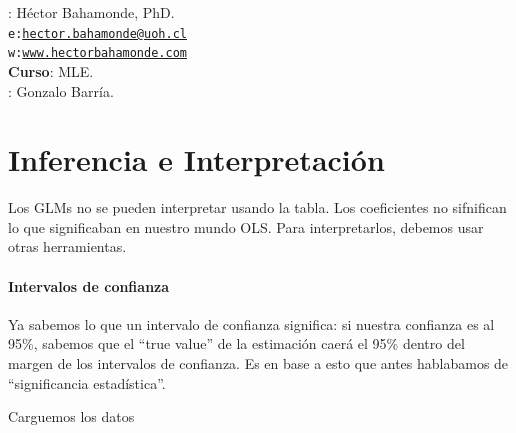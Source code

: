 \documentclass[onesided]{article}\usepackage[]{graphicx}\usepackage[]{color}
\begin{document}











\hspace{-5mm}{\bf Profesor}: H\'ector Bahamonde, PhD.\\
\texttt{e:}\href{mailto:hector.bahamonde@uoh.cl}{\texttt{hector.bahamonde@uoh.cl}}\\
\texttt{w:}\href{http://www.hectorbahamonde.com}{\texttt{www.hectorbahamonde.com}}\\
{\bf Curso}: MLE.\\
\hspace{-5mm}{\bf TA}: Gonzalo Barr\'ia.

\section{Inferencia e Interpretaci\'on}

Los GLMs no se pueden interpretar usando la tabla. Los coeficientes no sifnifican lo que significaban en nuestro mundo OLS. Para interpretarlos, debemos usar otras herramientas. 


\paragraph{Intervalos de confianza}

Ya sabemos lo que un intervalo de confianza significa: si nuestra confianza es al 95\%, sabemos que el ``true value'' de la estimaci\'on caer\'a el 95\% dentro del margen de los intervalos de confianza. Es en base a esto que antes hablabamos de ``significancia estad\'istica''.

Carguemos los datos
\end{document}
